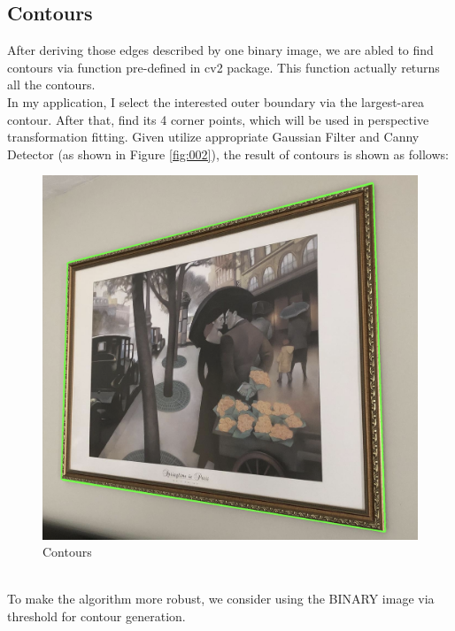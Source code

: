 \documentclass{article}
\begin{document}
\subsection{Contours}
After deriving those edges described by one binary image, we are abled to find contours via function pre-defined in cv2 package. This function actually returns all the contours. 
\vspace{4pt}
\\
In my application, I select the interested outer boundary via the largest-area contour. After that, find its 4 corner points, which will be used in perspective transformation fitting. Given utilize appropriate Gaussian Filter and Canny Detector (as shown in Figure \ref{fig:002}), the result of contours is shown as follows:
\begin{figure}[h]
	\centering
	\includegraphics[width=.25\textheight]{fig4.png}
	\caption{Contours}
	\label{fig:004}
\end{figure}
\\
To make the algorithm more robust, we consider using the BINARY image via threshold for contour generation.
\end{document}
